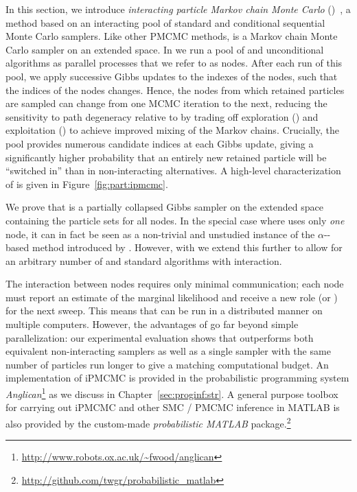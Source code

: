 
In this section, we introduce \emph{interacting particle Markov chain Monte Carlo} (\ipmcmc)~\citep{rainforth2016interacting},
a \pmcmc method based on an interacting pool of standard and conditional sequential Monte Carlo samplers. Like 
other PMCMC methods, \ipmcmc is a Markov chain Monte Carlo sampler on an extended space. In \ipmcmc we run a pool of 
\csmc and unconditional \smc algorithms as parallel processes that we refer to as nodes. After each run of this pool, 
we apply successive Gibbs updates to the indexes of the \csmc nodes, such that the indices of the \csmc nodes changes. 
Hence, the nodes from which retained particles are sampled can change from one MCMC iteration to the next, reducing
the sensitivity to path degeneracy relative to \pg 
by trading off exploration (\smc) and exploitation (\csmc) to achieve improved mixing of the Markov chains. Crucially, 
the pool provides numerous candidate indices at each Gibbs update, giving a significantly higher probability that an 
entirely new retained particle will be ``switched in'' than in non-interacting alternatives.  A high-level characterization
of \ipmcmc is given in Figure~\ref{fig:part:ipmcmc}.

We prove that \ipmcmc is a partially collapsed Gibbs sampler on the extended space containing the particle sets for all nodes. 
In the special case where \ipmcmc uses only \emph{one} \csmc node, it can in fact be seen as a non-trivial and unstudied 
instance of the $\alpha$-\smc-based \citep{whiteley2016} \pmcmc method introduced by \citet{huggins2015}. 
However, with \ipmcmc we extend this further to allow for an arbitrary number of \csmc and standard \smc algorithms 
with interaction.

The interaction between nodes requires only minimal communication; each node must report an estimate of the marginal likelihood 
and receive a new role (\smc or \csmc) for the next sweep. This means that \ipmcmc 
can be run in a distributed manner on multiple computers.  However, the advantages of \ipmcmc go far beyond
simple parallelization: our experimental evaluation shows that \ipmcmc outperforms both equivalent
non-interacting \pmcmc samplers as well as a single \pg sampler with the same number of particles run longer
to give a matching computational budget.
An implementation of iPMCMC is provided in the probabilistic programming system
\emph{Anglican}\footnote{\scriptsize \url{http://www.robots.ox.ac.uk/~fwood/anglican}} \citep{wood2014new} as we discuss in Chapter~\ref{sec:proginf:str}.  A general 
purpose toolbox for carrying out iPMCMC and other SMC / PMCMC inference in MATLAB is also provided by the custom-made \emph{probabilistic MATLAB} package.\footnote{\scriptsize \url{http://github.com/twgr/probabilistic_matlab}}

